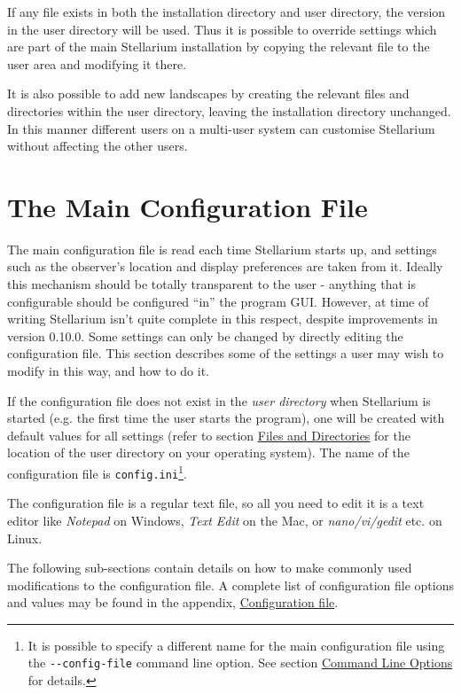 If any file exists in both the installation directory and user
directory, the version in the user directory will be used. Thus it is
possible to override settings which are part of the main Stellarium
installation by copying the relevant file to the user area and modifying
it there.

It is also possible to add new landscapes by creating the relevant files
and directories within the user directory, leaving the installation
directory unchanged. In this manner different users on a multi-user
system can customise Stellarium without affecting the other users.

\chapter{The Main Configuration File}\label{the-main-configuration-file}
\label{sec:ConfigurationFile}

The main configuration file is read each time Stellarium starts up, and
settings such as the observer's location and display preferences are
taken from it. Ideally this mechanism should be totally transparent to
the user - anything that is configurable should be configured ``in'' the
program GUI. However, at time of writing Stellarium isn't quite complete
in this respect, despite improvements in version 0.10.0. Some settings
can only be changed by directly editing the configuration file. This
section describes some of the settings a user may wish to modify in this
way, and how to do it.

If the configuration file does not exist in the \emph{user directory}
when Stellarium is started (e.g. the first time the user starts the
program), one will be created with default values for all settings
(refer to section \href{Advanced_Use\#Files_and_Directories}{Files and
Directories} for the location of the user directory on your operating
system). The name of the configuration file is
\texttt{config.ini}\footnote{It is possible to specify a different name
  for the main configuration file using the \texttt{-\/-config-file}
  command line option. See section
  \href{Advanced_Use\#Command_Line_Options}{Command Line Options} for
  details.}.

The configuration file is a regular text file, so all you need to edit
it is a text editor like \emph{Notepad} on Windows, \emph{Text Edit} on
the Mac, or \emph{nano/vi/gedit} etc. on Linux.

The following sub-sections contain details on how to make commonly used
modifications to the configuration file. A complete list of
configuration file options and values may be found in the appendix,
\href{Configuration_file}{Configuration file}.

